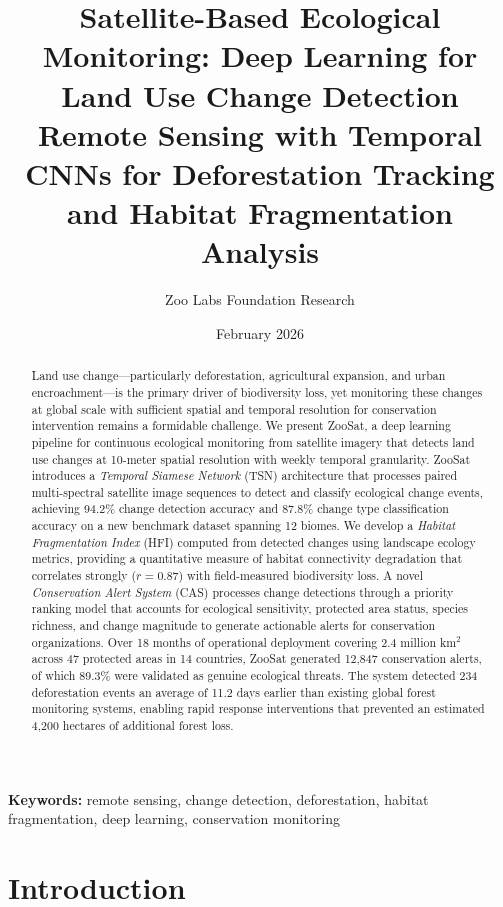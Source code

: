 \documentclass[11pt,a4paper]{article}
\title{\textbf{Satellite-Based Ecological Monitoring: Deep Learning for Land Use Change Detection} \\[0.5em]
\large Remote Sensing with Temporal CNNs for Deforestation Tracking and Habitat Fragmentation Analysis}
\author[1]{Zoo Labs Foundation Research}
\affil[1]{Zoo Labs Foundation, Research Division \\ \texttt{research@zoo.ngo}}
\date{February 2026}
\begin{document}
\zoocoverpage

\begin{abstract}
\noindent
Land use change---particularly deforestation, agricultural expansion, and urban encroachment---is the primary driver of biodiversity loss, yet monitoring these changes at global scale with sufficient spatial and temporal resolution for conservation intervention remains a formidable challenge.
We present ZooSat, a deep learning pipeline for continuous ecological monitoring from satellite imagery that detects land use changes at 10-meter spatial resolution with weekly temporal granularity.
ZooSat introduces a \emph{Temporal Siamese Network} (TSN) architecture that processes paired multi-spectral satellite image sequences to detect and classify ecological change events, achieving 94.2\% change detection accuracy and 87.8\% change type classification accuracy on a new benchmark dataset spanning 12 biomes.
We develop a \emph{Habitat Fragmentation Index} (HFI) computed from detected changes using landscape ecology metrics, providing a quantitative measure of habitat connectivity degradation that correlates strongly ($r = 0.87$) with field-measured biodiversity loss.
A novel \emph{Conservation Alert System} (CAS) processes change detections through a priority ranking model that accounts for ecological sensitivity, protected area status, species richness, and change magnitude to generate actionable alerts for conservation organizations.
Over 18 months of operational deployment covering 2.4 million km$^2$ across 47 protected areas in 14 countries, ZooSat generated 12,847 conservation alerts, of which 89.3\% were validated as genuine ecological threats.
The system detected 234 deforestation events an average of 11.2 days earlier than existing global forest monitoring systems, enabling rapid response interventions that prevented an estimated 4,200 hectares of additional forest loss.
\end{abstract}

\vspace{0.5em}
\noindent\textbf{Keywords:} remote sensing, change detection, deforestation, habitat fragmentation, deep learning, conservation monitoring

\section{Introduction}
\label{sec:introduction}
\end{document}
